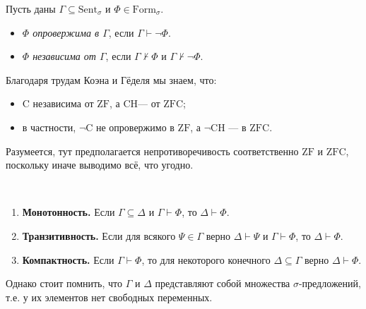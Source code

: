 \documentclass[12pt,a4paper]{article}
\newcommand{\ZF}{\ensuremath{\mathrm{ZF}}\xspace}
\newcommand{\Caxiom}{\ensuremath{\mathrm{C}}\xspace}
\newcommand{\ZFC}{\ensuremath{\mathrm{ZFC}}\xspace}
\newcommand{\CH}{\ensuremath{\mathrm{CH}}\xspace}
\newcommand{\Formul}{\ensuremath{\mathrm{Form}}\xspace}
\newcommand{\Sent}{\ensuremath{\mathrm{Sent}}\xspace}
\begin{document}
    \begin{definition}
        Пусть даны $\Gamma \subseteq \Sent_\sigma$ и $\Phi \in \Formul_\sigma$.
        \begin{itemize}
            \item \emph{$\Phi$ опровержима в $\Gamma$}, если $\Gamma \vdash \neg \Phi$.
            \item \emph{$\Phi$ независима от $\Gamma$}, если $\Gamma \nvdash \Phi$ и $\Gamma \nvdash \neg \Phi$.
        \end{itemize}
    \end{definition}

    \begin{example}
        Благодаря трудам Коэна и Гёделя мы знаем, что:
        \begin{itemize}
            \item \Caxiom независима от \ZF, а \CH --- от \ZFC;
            \item в частности, $\neg \Caxiom$ не опровержимо в \ZF, а $\neg \CH$ --- в \ZFC.
        \end{itemize}
        Разумеется, тут предполагается непротиворечивость соответственно \ZF и \ZFC, поскольку иначе выводимо всё, что угодно.
    \end{example}

    \begin{lemma}\ 
        \begin{enumerate}
            \item {\bf Монотонность.} Если $\Gamma \subseteq \Delta$ и $\Gamma \vdash \Phi$, то $\Delta \vdash \Phi$.
            \item {\bf Транзитивность.} Если для всякого $\Psi \in \Gamma$ верно $\Delta \vdash \Psi$ и $\Gamma \vdash \Phi$, то $\Delta \vdash \Phi$.
            \item {\bf Компактность.} Если $\Gamma \vdash \Phi$, то для некоторого конечного $\Delta \subseteq \Gamma$ верно $\Delta \vdash \Phi$.
        \end{enumerate}
    \end{lemma}

    \begin{remark*}
        Однако стоит помнить, что $\Gamma$ и $\Delta$ представляют собой множества $\sigma$-предложений, т.е. у их элементов нет свободных переменных.
    \end{remark*}
\end{document}
